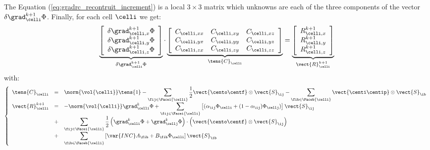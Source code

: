 The Equation (\ref{eq:gradrc_recontruit_increment}) is a local $3 \times 3$ matrix which unknowns are each of the three components of 
the vector $\delta \grad_\celli^{k+1} \Phi$. Finally, for each cell $\celli$ we get:
%
\begin{equation}\label{eq:eq_systeme_matriciel_gradrc}
\underbrace{
\left[\begin{array}{c}
\delta \grad_{\celli ,x}^{k+1} \Phi\\
\delta \grad_{\celli ,y}^{k+1} \Phi\\ 
\delta \grad_{\celli ,z}^{k+1} \Phi
\end{array}\right]
}_{\delta \grad_\celli^{k+1} \Phi }
\cdot
\underbrace{
\left[\begin{array}{ccc}
\displaystyle
  C_{\celli , xx}
& C_{\celli , xy}
& C_{\celli , xz}\\
\displaystyle
  C_{\celli , yx}
& C_{\celli , yy}
& C_{\celli , yz}\\
\displaystyle
  C_{\celli , zx}
& C_{\celli , zy}
& C_{\celli , zz}
\end{array}\right]
}_{\tens{C}_{\celli}}
=
\underbrace{
\left[\begin{array}{c}
\displaystyle
R^{k+1}_{\celli ,x}\\
\displaystyle
R^{k+1}_{\celli ,y}\\
\displaystyle
R^{k+1}_{\celli ,z}
\end{array}\right]
}_{\vect{R}^{k+1}_{\celli}}
\end{equation}
%
with:
%
\begin{equation}\label{eq:eq_second_membre_gradrc}
\left\{\begin{array}{rcl}
\tens{C}_\celli  &=& 
\displaystyle
\norm{\vol{\celli}} \tens{1} - 
\sum\limits_{ \fij \in \Facei{\celli}} \frac{1}{2}  \vect{\cento \centf} \otimes \vect{S}_{\ij} -
\sum\limits_{ \fib \in \Faceb{\celli}}  \vect{\centi \centip}  \otimes \vect{S}_{\ib} \\
\vect{R}^{k+1}_{\celli} &=&
\displaystyle 
 -\norm{\vol{\celli}}  \grad_{\celli}^{k} \Phi +
\sum\limits_{\fij \in \Facei{\celli}}\left[
(\alpha_{\ij} \Phi_\celli + (1 - \alpha_{\ij}) \Phi_\cellj)\right] \vect{S}_{\ij} \\
&+& \displaystyle
\sum\limits_{\fij \in \Facei{\celli}} \frac{1}{2} 
\left(\grad_\celli^k \Phi + \grad_\cellj^k \Phi \right) \cdot \left( \vect{\cento \centf} \otimes \vect{S}_{\ij} \right) \\
&+& \displaystyle 
\sum\limits_{\fib \in \Faceb{\celli}}\left[ \var{INC} A_{\fib} + B_{\fib} \Phi_\celli \right] \vect{S}_{\ib}
\end{array}\right.
\end{equation}

